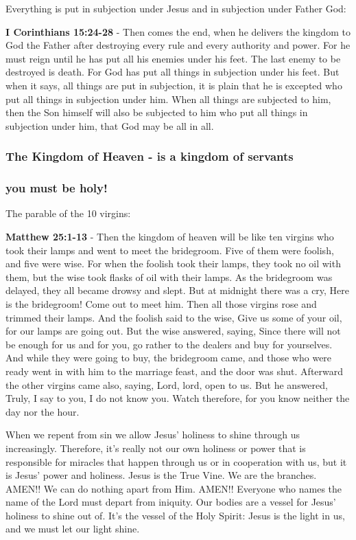 \documentclass[11pt]{article}
\begin{document}
Everything is put in subjection under Jesus and in subjection under Father God:

\textbf{I Corinthians 15:24-28} - Then comes the end, when he delivers the kingdom to God the Father after destroying every rule and every authority and power. For he must reign until he has put all his enemies under his feet. The last enemy to be destroyed is death. For God has put all things in subjection under his feet. But when it says, all things are put in subjection, it is plain that he is excepted who put all things in subjection under him. When all things are subjected to him, then the Son himself will also be subjected to him who put all things in subjection under him, that God may be all in all.

\subsubsection{The Kingdom of Heaven - is a kingdom of servants}
\label{sec:orgeca6d6b}
\subsubsection{you must be holy!}
\label{sec:org755729b}
The parable of the 10 virgins:

\textbf{Matthew 25:1-13} - Then the kingdom of heaven will be like ten virgins who took their lamps and went to meet the bridegroom. Five of them were foolish, and five were wise. For when the foolish took their lamps, they took no oil with them, but the wise took flasks of oil with their lamps. As the bridegroom was delayed, they all became drowsy and slept. But at midnight there was a cry, Here is the bridegroom! Come out to meet him. Then all those virgins rose and trimmed their lamps. And the foolish said to the wise, Give us some of your oil, for our lamps are going out. But the wise answered, saying, Since there will not be enough for us and for you, go rather to the dealers and buy for yourselves. And while they were going to buy, the bridegroom came, and those who were ready went in with him to the marriage feast, and the door was shut. Afterward the other virgins came also, saying, Lord, lord, open to us. But he answered, Truly, I say to you, I do not know you. Watch therefore, for you know neither the day nor the hour.

When we repent from sin we allow Jesus' holiness to shine through us increasingly.
Therefore, it's really not our own holiness or power that is responsible for miracles that happen through us or in cooperation with us, but it is Jesus' power and holiness.
Jesus is the True Vine. We are the branches. AMEN!! We can do nothing apart from Him. AMEN!!
Everyone who names the name of the Lord must depart from iniquity.
Our bodies are a vessel for Jesus' holiness to shine out of. It's the vessel of the Holy Spirit:
Jesus is the light in us, and we must let our light shine.
\end{document}
